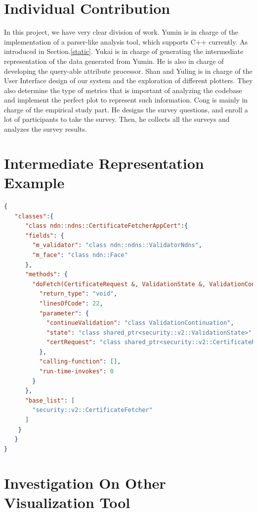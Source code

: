 \documentclass{sig-alternate}
\begin{document}
\section{Individual Contribution}
\label{IndivContri}
In this project, we have very clear division of work. Yumin is in charge of the implementation of a parser-like analysis tool, which supports C++ currently. As introduced in Section.\ref{static}. Yukai is in charge of generating the intermediate representation of the data generated from Yumin. He is also in charge of developing the query-able attribute processor. Shan and Yuling is in charge of the User Interface design of our system and the exploration of different plotters. They also determine the type of metrics that is important of analyzing the codebase and implement the perfect plot to represent such information. Cong is mainly in charge of the empirical study part. He designs the survey questions, and enroll a lot of participants to take the survey. Then, he collects all the surveys and analyzes the survey results. 

\section{Intermediate Representation Example}
\label{IReg}

\begin{lstlisting}[language=json,firstnumber=1]
{  
   "classes":{  
      "class ndn::ndns::CertificateFetcherAppCert":{
      "fields": {
        "m_validator": "class ndn::ndns::ValidatorNdns",
        "m_face": "class ndn::Face"
      },
      "methods": {
        "doFetch(CertificateRequest &, ValidationState &, ValidationContinuation &)": {
          "return_type": "void",
          "linesOfCode": 22,
          "parameter": {
            "continueValidation": "class ValidationContinuation",
            "state": "class shared_ptr<security::v2::ValidationState>",
            "certRequest": "class shared_ptr<security::v2::CertificateRequest>"
          },
          "calling-function": [],
          "run-time-invokes": 0
        }
      },
      "base_list": [
        "security::v2::CertificateFetcher"
      ]
    }
   }
}
\end{lstlisting}
\section{Investigation On Other Visualization Tool}
\end{document}
